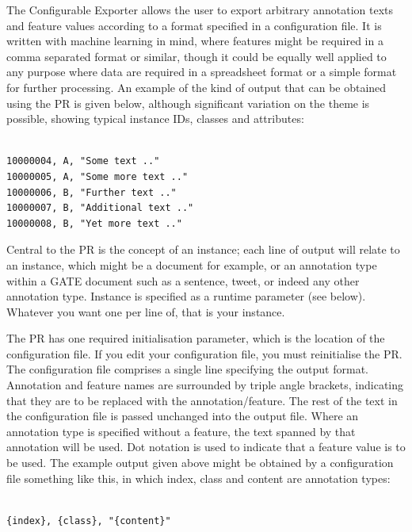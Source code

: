 
The Configurable Exporter allows the user to export arbitrary
annotation texts and feature values according to a format specified in
a configuration file. It is written with machine learning in mind,
where features might be required in a comma separated format or
similar, though it could be equally well applied to any purpose where
data are required in a spreadsheet format or a simple format for
further processing. An example of the kind of output that can be
obtained using the PR is given below, although significant variation
on the theme is possible, showing typical instance IDs, classes and
attributes:

\begin{verbatim}

10000004, A, "Some text .."
10000005, A, "Some more text .."
10000006, B, "Further text .."
10000007, B, "Additional text .."
10000008, B, "Yet more text .."

\end{verbatim}

Central to the PR is the concept of an instance; each line of output
will relate to an instance, which might be a document for example, or
an annotation type within a GATE document such as a sentence, tweet,
or indeed any other annotation type. Instance is specified as a
runtime parameter (see below). Whatever you want one per line of, that
is your instance.

The PR has one required initialisation parameter, which is the
location of the configuration file. If you edit your configuration
file, you must reinitialise the PR. The configuration file comprises a
single line specifying the output format. Annotation and feature names
are surrounded by triple angle brackets, indicating that they are to
be replaced with the annotation/feature. The rest of the text in the
configuration file is passed unchanged into the output file. Where an
annotation type is specified without a feature, the text spanned by
that annotation will be used. Dot notation is used to indicate that a
feature value is to be used. The example output given above might be
obtained by a configuration file something like this, in which index,
class and content are annotation types:

\begin{verbatim}

{index}, {class}, "{content}"

\end{verbatim}


